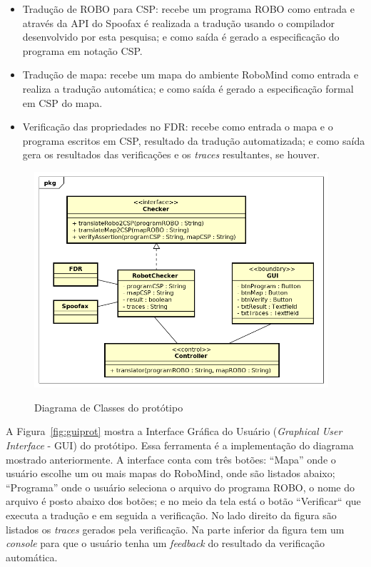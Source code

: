 \begin{itemize}
    \item Tradução de ROBO para CSP: recebe um programa ROBO como entrada e através da API do Spoofax é realizada a tradução usando o compilador desenvolvido por esta pesquisa; e como saída é gerado a especificação do programa em notação CSP.
    \item Tradução de mapa: recebe um mapa do ambiente RoboMind como entrada e realiza a tradução automática; e como saída é gerado a especificação formal em CSP do mapa.
    \item Verificação das propriedades no FDR: recebe como entrada o mapa e o programa escritos em CSP, resultado da tradução automatizada; e como saída gera os resultados das verificações e os \textit{traces} resultantes, se houver.
\end{itemize}

\begin{figure}[!h]
\centering
\caption{Diagrama de Classes do protótipo}
\includegraphics[height=8cm]{figuras/class_diagram.png}
\label{fig:diagrama}
\end{figure}

A Figura~\ref{fig:guiprot} mostra a Interface Gráfica do Usuário (\textit{Graphical User Interface} - GUI) do protótipo. Essa ferramenta é a implementação do diagrama mostrado anteriormente. A interface conta com três botões: ``Mapa'' onde o usuário escolhe um ou mais mapas do RoboMind, onde são listados abaixo; ``Programa'' onde o usuário seleciona o arquivo do programa ROBO, o nome do arquivo é posto abaixo dos botões; e no meio da tela está o botão ``Verificar`` que executa a tradução e em seguida a verificação. No lado direito da figura são listados os \textit{traces} gerados pela verificação. Na parte inferior da figura tem um \textit{console} para que o usuário tenha um \textit{feedback} do resultado da verificação automática.

